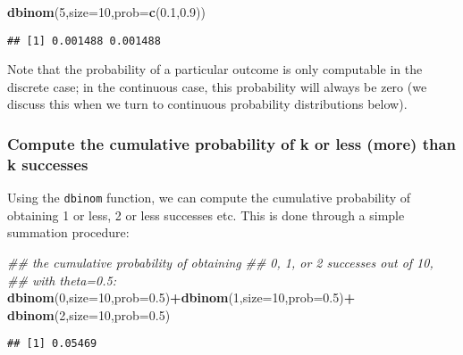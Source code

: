 \documentclass[12pt,]{krantz}
\newenvironment{Shaded}{\begin{snugshade}}{\end{snugshade}}
\newcommand{\CommentTok}[1]{\textcolor[rgb]{0.56,0.35,0.01}{\textit{#1}}}
\newcommand{\DataTypeTok}[1]{\textcolor[rgb]{0.13,0.29,0.53}{#1}}
\newcommand{\DecValTok}[1]{\textcolor[rgb]{0.00,0.00,0.81}{#1}}
\newcommand{\FloatTok}[1]{\textcolor[rgb]{0.00,0.00,0.81}{#1}}
\newcommand{\KeywordTok}[1]{\textcolor[rgb]{0.13,0.29,0.53}{\textbf{#1}}}
\newcommand{\NormalTok}[1]{#1}
\newcommand{\OperatorTok}[1]{\textcolor[rgb]{0.81,0.36,0.00}{\textbf{#1}}}
\newcommand{\StringTok}[1]{\textcolor[rgb]{0.31,0.60,0.02}{#1}}
\begin{document}
\begin{Shaded}
\begin{Highlighting}[]
\KeywordTok{dbinom}\NormalTok{(}\DecValTok{5}\NormalTok{,}\DataTypeTok{size=}\DecValTok{10}\NormalTok{,}\DataTypeTok{prob=}\KeywordTok{c}\NormalTok{(}\FloatTok{0.1}\NormalTok{,}\FloatTok{0.9}\NormalTok{))}
\end{Highlighting}
\end{Shaded}

\begin{verbatim}
## [1] 0.001488 0.001488
\end{verbatim}

Note that the probability of a particular outcome is only computable in the discrete case; in the continuous case, this probability will always be zero (we discuss this when we turn to continuous probability distributions below).

\hypertarget{compute-the-cumulative-probability-of-k-or-less-more-than-k-successes}{%
\subsubsection{Compute the cumulative probability of k or less (more) than k successes}\label{compute-the-cumulative-probability-of-k-or-less-more-than-k-successes}}

Using the \texttt{dbinom} function, we can compute the cumulative probability of obtaining 1 or less, 2 or less successes etc. This is done through a simple summation procedure:

\begin{Shaded}
\begin{Highlighting}[]
\CommentTok{## the cumulative probability of obtaining}
\CommentTok{## 0, 1, or 2 successes out of 10,}
\CommentTok{## with theta=0.5:}
\KeywordTok{dbinom}\NormalTok{(}\DecValTok{0}\NormalTok{,}\DataTypeTok{size=}\DecValTok{10}\NormalTok{,}\DataTypeTok{prob=}\FloatTok{0.5}\NormalTok{)}\OperatorTok{+}\KeywordTok{dbinom}\NormalTok{(}\DecValTok{1}\NormalTok{,}\DataTypeTok{size=}\DecValTok{10}\NormalTok{,}\DataTypeTok{prob=}\FloatTok{0.5}\NormalTok{)}\OperatorTok{+}
\StringTok{  }\KeywordTok{dbinom}\NormalTok{(}\DecValTok{2}\NormalTok{,}\DataTypeTok{size=}\DecValTok{10}\NormalTok{,}\DataTypeTok{prob=}\FloatTok{0.5}\NormalTok{)}
\end{Highlighting}
\end{Shaded}

\begin{verbatim}
## [1] 0.05469
\end{verbatim}
\end{document}
